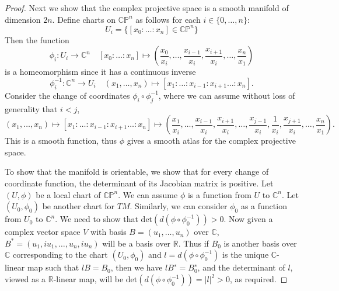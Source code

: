 \documentclass{article}
\begin{document}
\begin{enumerate}[label={\bf Q\arabic*:}]
\begin{proof}
      Next we show that the complex projective space is a smooth manifold
      of dimension $2n$. Define charts on $\mathbb{C}\mathbb{P}^n$ as
      follows for each $i\in\{0,\ldots,n\}$:
      \[U_i= \{[x_0:\ldots:x_n]\in\mathbb{C}\mathbb{P}^n\}\]
      Then the function
      \[\phi_i:U_i\rightarrow\mathbb{C}^n\quad [x_0:\ldots:x_n]\mapsto
        \left(\frac{x_0}{x_i},\ldots,\frac{x_{i-1}}{x_i},
        \frac{x_{i+1}}{x_i},\ldots,\frac{x_n}{x_1}\right)\]
      is a homeomorphism since it has a continuous inverse
      \[\phi_i^{-1}:\mathbb{C}^n\rightarrow U_i\quad
        (x_1,\ldots,x_n)\mapsto[x_1:\ldots:x_{i-1}:x_{i+1}\ldots:x_n].\]
      Consider the change of coordinates $\phi_i\circ\phi_j^{-1}$, where we
      can assume without loss of generality that $i<j$,
      \[(x_1,\ldots,x_n)\mapsto [x_1:\ldots:x_{i-1}:x_{i+1}\ldots:x_n]
        \mapsto\left(\frac{x_1}{x_i},\ldots,
        \frac{x_{i-1}}{x_i},\frac{x_{i+1}}{x_i},
        \ldots,\frac{x_{j-1}}{x_i},\frac{1}{x_i},\frac{x_{j+1}}{x_i},
        \ldots,\frac{x_n}{x_1}\right).\]
      This is a smooth function, thus $\phi$ gives a smooth atlas for the
      complex projective space.

      To show that the manifold is orientable, we show that for every
      change of coordinate function, the determinant of its Jacobian matrix
      is positive. Let $(U,\phi)$ be a local chart of
      $\mathbb{C}\mathbb{P}^n$. We can assume $\phi$ is a function from $U$
      to $\mathbb{C}^n$. Let $(U_0,\phi_0)$ be another chart for $TM$.
      Similarly, we can consider $\phi_0$ as a function from $U_0$ to
      $\mathbb{C}^n$. We need to show that
      $\text{det}(d(\phi\circ\phi_0^{-1}))>0$. Now given a complex vector
      space $V$ with basis $B=(u_1,\ldots,u_n)$ over $\mathbb{C}$,
      $B^*=(u_1,iu_1,\ldots,u_n,iu_n)$ will be a basis over $\mathbb{R}$.
      Thus if $B_0$ is another basis over $\mathbb{C}$ corresponding to the
      chart $(U_0,\phi_0)$ and $l=d(\phi\circ\phi_0^{-1})$ is the unique
      $\mathbb{C}$-linear map such that $lB=B_0$, then we have
      $lB^∗=B^∗_0$, and the determinant of $l$, viewed as a
      $\mathbb{R}$-linear map, will be
      $\text{det}(d(\phi\circ\phi_0^{-1}))=|l|^2>0$, as required.



\end{proof}
\end{enumerate}
\end{document}
